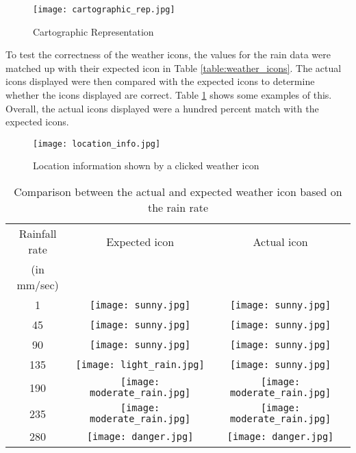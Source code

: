 \begin{figure}
    \centering
        \texttt{[image: cartographic\_rep.jpg]}
    \caption{Cartographic Representation}
    \label{fig:cartographic}
\end{figure}
\bigskip

To test the correctness of the weather icons, the values for the rain data were matched up with their expected icon in Table \ref{table:weather_icons}. The actual icons displayed were then compared with the expected icons to determine whether the icons displayed are correct. Table \ref{table:icon_comparison} shows some examples of this. Overall, the actual icons displayed were a hundred percent match with the expected icons.

\begin{figure}
    \centering
        \texttt{[image: location\_info.jpg]}
    \caption{Location information shown by a clicked weather icon}
    \label{fig:location_click}
\end{figure}

\begin{table}
\caption{Comparison between the actual and expected weather icon based on the rain rate}
\centering
\begin{tabular}{c c c}%
\hline\hline
Rainfall rate & Expected icon & Actual icon
 \\ (in mm/sec) &  &  \\ [0.5ex]
\hline
1 & \texttt{[image: sunny.jpg]} & \texttt{[image: sunny.jpg]} \\
45 & \texttt{[image: sunny.jpg]} & \texttt{[image: sunny.jpg]} \\ 
90 & \texttt{[image: sunny.jpg]} & \texttt{[image: sunny.jpg]} \\ 
135 & \texttt{[image: light\_rain.jpg]} & \texttt{[image: sunny.jpg]} \\
190 & \texttt{[image: moderate\_rain.jpg]} & \texttt{[image: moderate\_rain.jpg]} \\
235 & \texttt{[image: moderate\_rain.jpg]} & \texttt{[image: moderate\_rain.jpg]} \\
280 & \texttt{[image: danger.jpg]} & \texttt{[image: danger.jpg]}\\ [1ex]
\hline
\end{tabular}
\label{table:icon_comparison}
\end{table}
\bigskip

